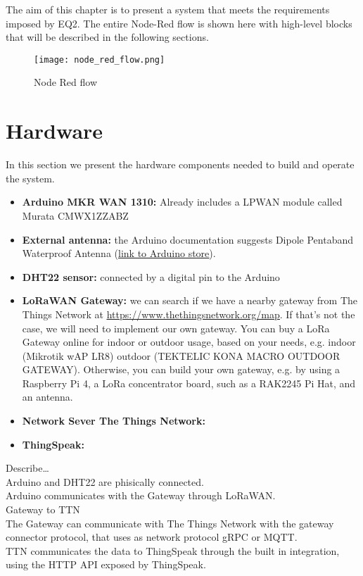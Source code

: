 The aim of this chapter is to present a system that meets the requirements imposed by EQ2.
The entire Node-Red flow is shown here with high-level blocks that will be described in the following sections.
\begin{figure}[H]
    \centering
    \texttt{[image: node\_red\_flow.png]}
    \caption{Node Red flow}
\end{figure}

\section{Hardware}
In this section we present the hardware components needed to build and operate the system. 
\begin{itemize}
\item \textbf{Arduino MKR WAN 1310:} Already includes a LPWAN module called Murata CMWX1ZZABZ
\item \textbf{External antenna:} the Arduino documentation suggests Dipole Pentaband Waterproof Antenna ({\color{blue}\underline{\href{https://store.arduino.cc/products/dipole-pentaband-waterproof-antenna}{link to Arduino store}}}).
\item \textbf{DHT22 sensor:} connected by a digital pin to the Arduino
\item \textbf{LoRaWAN Gateway:} we can search if we have a nearby gateway from The Things Network at {\color{blue}\underline{\url{https://www.thethingsnetwork.org/map}}}. If that’s not the case, we will need to implement our own gateway. 
You can buy a LoRa Gateway online for indoor or outdoor usage, based on your needs, e.g. indoor (Mikrotik wAP LR8) outdoor (TEKTELIC KONA MACRO OUTDOOR GATEWAY).
Otherwise, you can build your own gateway, e.g. by using a Raspberry Pi 4, a  LoRa concentrator board, such as a RAK2245 Pi Hat, and an antenna.
\item \textbf{Network Sever The Things Network:}
\item \textbf{ThingSpeak:}
\end{itemize}
Describe…
\\
Arduino and DHT22 are phisically connected.\\
Arduino communicates with the Gateway through LoRaWAN.\\
Gateway to TTN \\
The Gateway can communicate with The Things Network with the gateway connector protocol, that uses as network protocol gRPC or MQTT.\\
TTN communicates the data to ThingSpeak through the built in integration, using the HTTP API exposed by ThingSpeak.\\
\\

